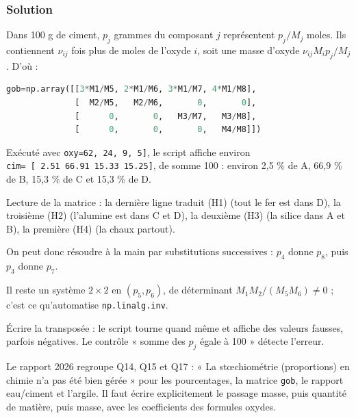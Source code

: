 \documentclass[11pt,a4paper]{article}
\newcommand{\equationajustee}[1]{%
  \sbox{\boiteequation}{$\displaystyle #1$}%
  \ifdim\wd\boiteequation>\linewidth
    \[\resizebox{\linewidth}{!}{\usebox{\boiteequation}}\]%
  \else
    \[#1\]%
  \fi}
\begin{document}
\hypertarget{solution-13}{%
\subsubsection{Solution}\label{solution-13}}

Dans 100 g de ciment, \(p_j\) grammes du composant \(j\) représentent \(p_j/M_j\) moles. Ils contiennent \(\nu_{ij}\) fois plus de moles de l'oxyde \(i\), soit une masse d'oxyde \(\nu_{ij}M_ip_j/M_j\). D'où :

\equationajustee{\beta_{ij}=\nu_{ij}\,\frac{M_i}{M_j}}

\begin{lstlisting}[language=Python]
gob=np.array([[3*M1/M5, 2*M1/M6, 3*M1/M7, 4*M1/M8],
              [  M2/M5,   M2/M6,       0,       0],
              [      0,       0,   M3/M7,   M3/M8],
              [      0,       0,       0,   M4/M8]])
\end{lstlisting}

Exécuté avec \texttt{oxy=\allowbreak{}{[}62,\allowbreak{}\ 24,\allowbreak{}\ 9,\allowbreak{}\ 5{]}\allowbreak{}}, le script affiche environ \texttt{cim=\allowbreak{}\ {[}\ 2.51\ 66.91\ 15.33\ 15.25{]}\allowbreak{}}, de somme 100 : environ 2,5 \% de A, 66,9 \% de B, 15,3 \% de C et 15,3 \% de D.

Lecture de la matrice : la dernière ligne traduit (H1) (tout le fer est dans D), la troisième (H2) (l'alumine est dans C et D), la deuxième (H3) (la silice dans A et B), la première (H4) (la chaux partout).

On peut donc résoudre à la main par substitutions successives : \(p_4\) donne \(p_8\), puis \(p_3\) donne \(p_7\).

Il reste un système \(2\times2\) en \((p_5,p_6)\), de déterminant \(M_1M_2/(M_5M_6)\ne0\) ; c'est ce qu'automatise \texttt{np.linalg.inv}.

\begin{piege}

Écrire la transposée : le script tourne quand même et affiche des valeurs fausses, parfois négatives. Le contrôle « somme des \(p_j\) égale à 100 » détecte l'erreur.

\end{piege}

\begin{jury}

Le rapport 2026 regroupe Q14, Q15 et Q17 : « La stœchiométrie (proportions) en chimie n'a pas été bien gérée » pour les pourcentages, la matrice \texttt{gob}, le rapport eau/ciment et l'argile. Il faut écrire explicitement le passage masse, puis quantité de matière, puis masse, avec les coefficients des formules oxydes.

\end{jury}
\end{document}
